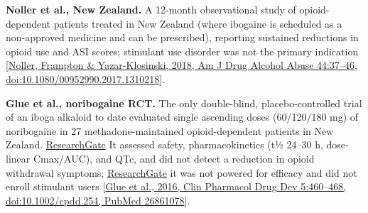 \textbf{Noller et al., New Zealand.} A 12-month observational study of opioid-dependent patients treated in New Zealand (where ibogaine is scheduled as a non-approved medicine and can be prescribed), reporting sustained reductions in opioid use and ASI scores; stimulant use disorder was not the primary indication {[}\href{https://www.tandfonline.com/doi/full/10.1080/00952990.2017.1310218}{Noller, Frampton \& Yazar-Klosinski, 2018, Am J Drug Alcohol Abuse 44:37--46, doi:10.1080/00952990.2017.1310218}{]}.

\textbf{Glue et al., noribogaine RCT.} The only double-blind, placebo-controlled trial of an iboga alkaloid to date evaluated single ascending doses (60/120/180 mg) of noribogaine in 27 methadone-maintained opioid-dependent patients in New Zealand. \href{https://www.researchgate.net/publication/294138827_Ascending_Single-Dose_Double-Blind_Placebo-Controlled_Safety_Study_of_Noribogaine_in_Opioid-Dependent_Patients}{ResearchGate} It assessed safety, pharmacokinetics (t½ 24--30 h, dose-linear Cmax/AUC), and QTc, and did not detect a reduction in opioid withdrawal symptoms; \href{https://www.researchgate.net/publication/294138827_Ascending_Single-Dose_Double-Blind_Placebo-Controlled_Safety_Study_of_Noribogaine_in_Opioid-Dependent_Patients}{ResearchGate} it was not powered for efficacy and did not enroll stimulant users {[}\href{https://accp1.onlinelibrary.wiley.com/doi/10.1002/cpdd.254}{Glue et al., 2016, Clin Pharmacol Drug Dev 5:460--468, doi:10.1002/cpdd.254, PubMed 26861078}{]}.

